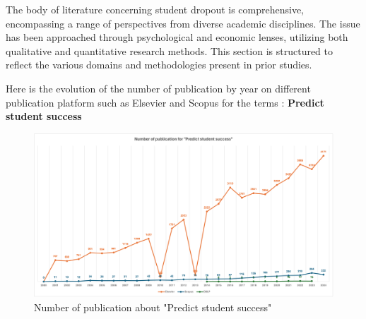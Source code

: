 \documentclass[../../main.tex]{subfiles}
\begin{document}
The body of literature concerning student dropout is comprehensive, encompassing a range of perspectives from diverse academic disciplines. The issue has been approached through psychological and economic lenses, utilizing both qualitative and quantitative research methods. This section is structured to reflect the various domains and methodologies present in prior studies.

Here is the evolution of the number of publication by year on different publication platform such as Elsevier and Scopus for the terms : \textbf{Predict student success}
\begin{figure}
    \centering
    \includegraphics[width=1\linewidth]{res//graph/numberOfPub.png}
    \caption{Number of publication about "Predict student success"}
    \label{fig:nb_pub}
\end{figure}
\end{document}
